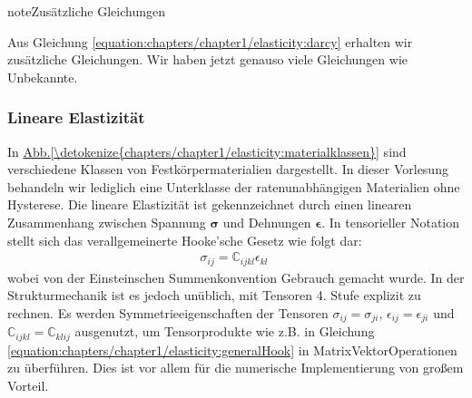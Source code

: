 \documentclass[letterpaper,10pt,german]{jupyterBook}
\begin{document}
\begin{sphinxadmonition}{note}{Zusätzliche Gleichungen}

\sphinxAtStartPar
Aus Gleichung \eqref{equation:chapters/chapter1/elasticity:darcy} erhalten wir  zusätzliche Gleichungen. Wir haben jetzt genauso viele Gleichungen wie Unbekannte.
\end{sphinxadmonition}




\subsubsection{Lineare Elastizität}
\label{\detokenize{chapters/chapter1/elasticity:lineare-elastizitat}}
\sphinxAtStartPar
In \hyperref[\detokenize{chapters/chapter1/elasticity:materialklassen}]{Abb.\@ \ref{\detokenize{chapters/chapter1/elasticity:materialklassen}}} sind verschiedene Klassen von Festkörpermaterialien dargestellt. In dieser Vorlesung behandeln wir lediglich eine Unterklasse der ratenunabhängigen Materialien ohne Hysterese. Die lineare Elastizität ist gekennzeichnet durch einen linearen Zusammenhang zwischen Spannung \(\bm{\sigma}\) und Dehnungen \(\bm{\epsilon}\). In tensorieller Notation stellt sich das verallgemeinerte Hooke’sche Gesetz wie folgt dar:
\begin{equation}\label{equation:chapters/chapter1/elasticity:generalHook}
\begin{split}\sigma_{ij} = \mathbb{C}_{ijkl} \epsilon_{kl} \;\end{split}
\end{equation}
\sphinxAtStartPar
wobei von der Einsteinschen Summenkonvention Gebrauch gemacht wurde. In der Strukturmechanik ist es jedoch unüblich, mit Tensoren 4. Stufe explizit zu rechnen. Es werden Symmetrieeigenschaften der Tensoren \(\sigma_{ij}=\sigma_{ji}\), \(\epsilon_{ij}=\epsilon_{ji}\) und \(\mathbb{C}_{ijkl}=\mathbb{C}_{klij}\) ausgenutzt, um Tensorprodukte wie z.B. in Gleichung \eqref{equation:chapters/chapter1/elasticity:generalHook} in Matrix\sphinxhyphen{}Vektor\sphinxhyphen{}Operationen zu überführen. Dies ist vor allem für die numerische Implementierung von großem Vorteil.
\end{document}
